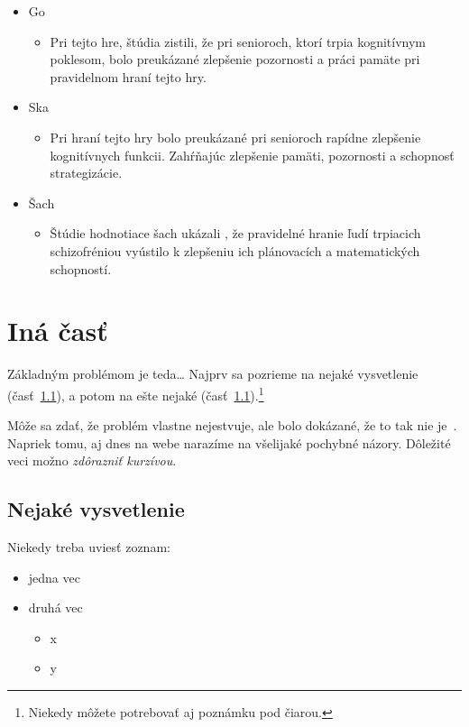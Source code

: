 \documentclass[10pt,oneside,slovak,a4paper]{article}
\begin{document}
\begin{itemize}
    \item Go
    	\begin{itemize}
        	\item {Pri tejto hre, štúdia \cite{Aydin:2015} zistili, že pri senioroch, ktorí trpia kognitívnym poklesom, bolo preukázané zlepšenie pozornosti a práci pamäte pri pravidelnom hraní tejto hry.}
    	\end{itemize}
    \item Ska
        \begin{itemize}
        	\item{Pri hraní tejto hry bolo preukázané \cite{Panphunpho:2013} pri senioroch rapídne zlepšenie kognitívnych funkcii. Zahŕňajúc zlepšenie pamäti, pozornosti a schopnosť strategizácie.}
    	\end{itemize}
    \item Šach
        \begin{itemize}
        	\item{Štúdie hodnotiace šach ukázali \cite{Sala:2015, Demily:2009}, že pravidelné hranie ľudí trpiacich schizofréniou vyústilo k zlepšeniu ich plánovacích a matematických schopností.}
    	\end{itemize}
\end{itemize}

\section{Iná časť} \label{ina}

Základným problémom je teda\ldots{} Najprv sa pozrieme na nejaké vysvetlenie (časť~\ref{ina:nejake}), a potom na ešte nejaké (časť~\ref{ina:nejake}).\footnote{Niekedy môžete potrebovať aj poznámku pod čiarou.}

Môže sa zdať, že problém vlastne nejestvuje\cite{Coplien:MPD}, ale bolo dokázané, že to tak nie je~\cite{Czarnecki:Staged, Czarnecki:Progress}. Napriek tomu, aj dnes na webe narazíme na všelijaké pochybné názory\cite{PLP-Framework}. Dôležité veci možno \emph{zdôrazniť kurzívou}.


\subsection{Nejaké vysvetlenie} \label{ina:nejake}

Niekedy treba uviesť zoznam:

\begin{itemize}
\item jedna vec
\item druhá vec
	\begin{itemize}
	\item x
	\item y
	\end{itemize}
\end{itemize}
\end{document}
